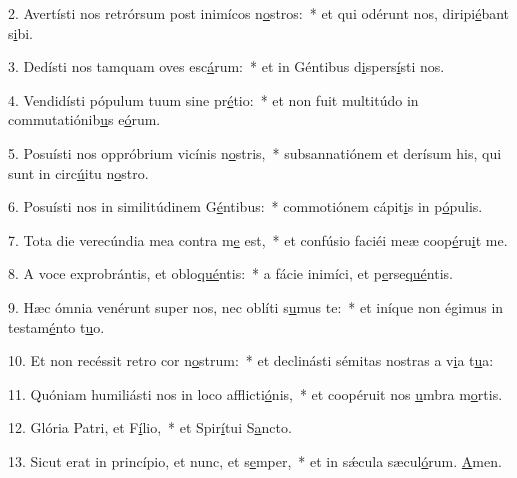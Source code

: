 2. Avertísti nos retrórsum post inimícos n\uline{o}stros:~* et qui odérunt nos, diripi\uline{é}bant s\uline{i}bi.\par 
3. Dedísti nos tamquam oves esc\uline{á}rum:~* et in Géntibus d\uline{i}spers\uline{í}sti nos.\par 
4. Vendidísti pópulum tuum sine pr\uline{é}tio:~* et non fuit multitúdo in commutatiónib\uline{u}s e\uline{ó}rum.\par 
5. Posuísti nos oppróbrium vicínis n\uline{o}stris,~* subsannatiónem et derísum his, qui sunt in circ\uline{ú}itu n\uline{o}stro.\par 
6. Posuísti nos in similitúdinem G\uline{é}ntibus:~* commotiónem cápit\uline{i}s in p\uline{ó}pulis.\par 
7. Tota die verecúndia mea contra m\uline{e} est,~* et confúsio faciéi meæ coop\uline{é}ru\uline{i}t me.\par 
8. A voce exprobrántis, et oblo\uline{qué}ntis:~* a fácie inimíci, et p\uline{e}rse\uline{qué}ntis.\par 
9. Hæc ómnia venérunt super nos, nec oblíti s\uline{u}mus te:~* et iníque non égimus in testam\uline{é}nto t\uline{u}o.\par 
10. Et non recéssit retro cor n\uline{o}strum:~* et declinásti sémitas nostras a v\uline{i}a t\uline{u}a:\par 
11. Quóniam humiliásti nos in loco afflicti\uline{ó}nis,~* et coopéruit nos \uline{u}mbra m\uline{o}rtis.\par 
12. Glória Patri, et F\uline{í}lio,~* et Spir\uline{í}tui S\uline{a}ncto.\par 
13. Sicut erat in princípio, et nunc, et s\uline{e}mper,~* et in sǽcula sæcul\uline{ó}rum. \uline{A}men.\par 
